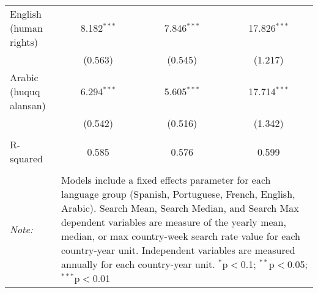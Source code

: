 \begin{table}[!htbp]
\begin{tabular}{@{\extracolsep{5pt}}lccc}
  English (human rights) & 8.182$^{***}$ & 7.846$^{***}$ & 17.826$^{***}$ \\ 
  & (0.563) & (0.545) & (1.217) \\ 
  Arabic (huquq alansan) & 6.294$^{***}$ & 5.605$^{***}$ & 17.714$^{***}$ \\ 
  & (0.542) & (0.516) & (1.342) \\ 
 \hline \\[-1.8ex] 
R-squared  & 0.585 & 0.576 & 0.599 \\ 
\hline 
\hline \\[-1.8ex] 
\textit{Note:}  & \multicolumn{3}{l}{\parbox[t]{8cm}{Models include a fixed effects parameter for each language group (Spanish, Portuguese, French, English, Arabic). Search Mean, Search Median, and Search Max dependent variables are measure of the yearly mean, median, or max country-week search rate value for each country-year unit. Independent variables are measured annually for each country-year unit. $^{*}$p$<$0.1; $^{**}$p$<$0.05; $^{***}$p$<$0.01}} \\ 
\end{tabular} 
\end{table} 

